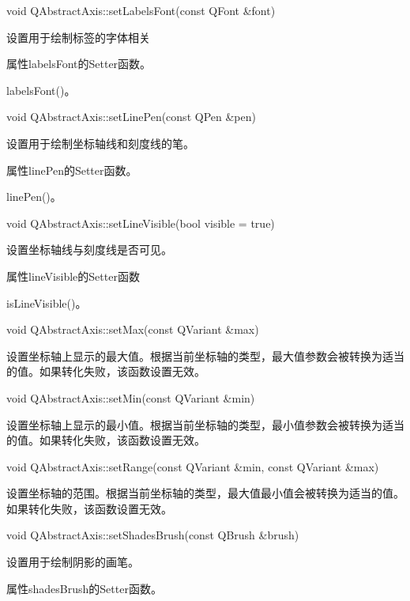 void QAbstractAxis::setLabelsFont(const QFont \&font) 

设置用于绘制标签的字体相关 

\begin{notice}
属性labelsFont的Setter函数。
\end{notice}
    
\begin{seeAlso}
labelsFont()。
\end{seeAlso}
    
void QAbstractAxis::setLinePen(const QPen \&pen) 

设置用于绘制坐标轴线和刻度线的笔。 


\begin{notice}
属性linePen的Setter函数。
\end{notice}
 
\begin{seeAlso}
linePen()。
\end{seeAlso}

void QAbstractAxis::setLineVisible(bool visible = true) 

设置坐标轴线与刻度线是否可见。 

\begin{notice}
属性lineVisible的Setter函数
\end{notice}
     
\begin{seeAlso}
isLineVisible()。
\end{seeAlso}

void QAbstractAxis::setMax(const QVariant \&max) 

设置坐标轴上显示的最大值。根据当前坐标轴的类型，最大值参数会被转换为适当的值。如果转化失败，该函数设置无效。

void QAbstractAxis::setMin(const QVariant \&min) 

设置坐标轴上显示的最小值。根据当前坐标轴的类型，最小值参数会被转换为适当的值。如果转化失败，该函数设置无效。

void QAbstractAxis::setRange(const QVariant \&min, const QVariant
\&max) 

设置坐标轴的范围。根据当前坐标轴的类型，最大值最小值会被转换为适当的值。如果转化失败，该函数设置无效。

void QAbstractAxis::setShadesBrush(const QBrush \&brush)

设置用于绘制阴影的画笔。 

\begin{notice}
属性shadesBrush的Setter函数。
\end{notice}
         

